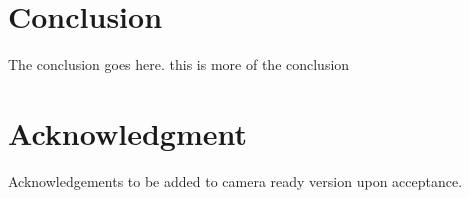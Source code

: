 \section{Conclusion}
The conclusion goes here. this is more of the conclusion



\section*{Acknowledgment}


Acknowledgements to be added to camera ready version upon acceptance.